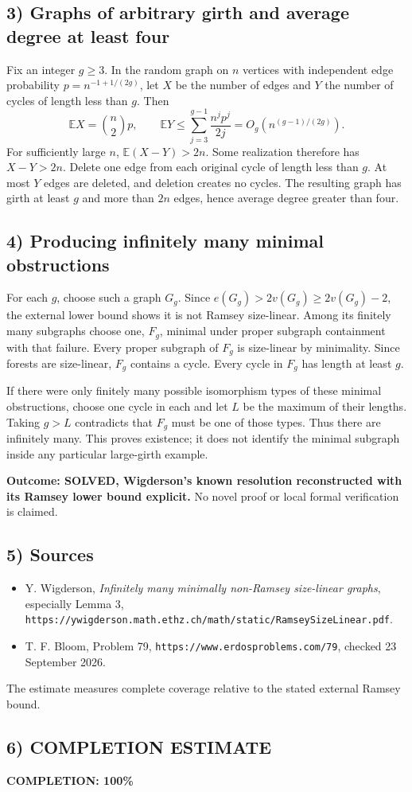 \subsection{3) Graphs of arbitrary girth and average degree at least four}
Fix an integer $g\geq3$. In the random graph on $n$ vertices with
independent edge probability $p=n^{-1+1/(2g)}$, let $X$ be the
number of edges and $Y$ the number of cycles of length less than $g$.
Then
\[
 \mathbb EX=\binom n2p,\qquad
 \mathbb EY\leq\sum_{j=3}^{g-1}\frac{n^jp^j}{2j}
 =O_g(n^{(g-1)/(2g)}).
\]
For sufficiently large $n$, $\mathbb E(X-Y)>2n$. Some realization
therefore has $X-Y>2n$. Delete one edge from each original cycle
of length less than $g$. At most $Y$ edges are deleted, and deletion
creates no cycles. The resulting graph has girth at least $g$ and
more than $2n$ edges, hence average degree greater than four.

\subsection{4) Producing infinitely many minimal obstructions}
For each $g$, choose such a graph $G_g$. Since
$e(G_g)>2v(G_g)\geq2v(G_g)-2$, the external lower bound shows
it is not Ramsey size-linear. Among its finitely many subgraphs
choose one, $F_g$, minimal under proper subgraph containment with
that failure. Every proper subgraph of $F_g$ is size-linear by
minimality. Since forests are size-linear, $F_g$ contains a cycle.
Every cycle in $F_g$ has length at least $g$.

If there were only finitely many possible isomorphism types of
these minimal obstructions, choose one cycle in each and let $L$
be the maximum of their lengths. Taking $g>L$ contradicts that
$F_g$ must be one of those types. Thus there are infinitely many.
This proves existence; it does not identify the minimal subgraph
inside any particular large-girth example.

\textbf{Outcome: SOLVED, Wigderson's known resolution reconstructed
with its Ramsey lower bound explicit.} No novel proof or local
formal verification is claimed.

\subsection{5) Sources}
\begin{itemize}
\item Y. Wigderson, \emph{Infinitely many minimally non-Ramsey
size-linear graphs}, especially Lemma 3,
\texttt{https://ywigderson.math.ethz.ch/math/static/RamseySizeLinear.pdf}.
\item T. F. Bloom, Problem 79,
\texttt{https://www.erdosproblems.com/79}, checked 23 September 2026.
\end{itemize}
The estimate measures complete coverage relative to the stated
external Ramsey bound.
\subsection{6) COMPLETION ESTIMATE}
\textbf{COMPLETION: 100\%}
